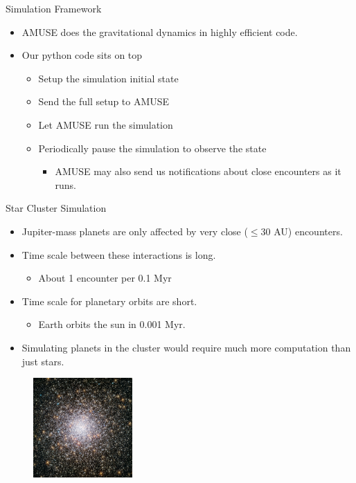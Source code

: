 \documentclass{beamer}
\begin{document}
\begin{frame}{Simulation Framework}
    \begin{itemize}
        \item AMUSE does the gravitational dynamics in highly efficient code.
        \item Our python code sits on top
        \begin{itemize}
            \item Setup the simulation initial state
            \item Send the full setup to AMUSE
            \item Let AMUSE run the simulation
            \item Periodically pause the simulation to observe the state
                \begin{itemize}
                    \item AMUSE may also send us notifications about close encounters
                        as it runs.
                \end{itemize}
        \end{itemize}
    \end{itemize}
\end{frame}

\begin{frame}{Star Cluster Simulation}
    \begin{itemize}
        \item Jupiter-mass planets are only affected by very close ($\le $30 AU) encounters.
        \item Time scale between these interactions is long.
            \begin{itemize}
                \item About 1 encounter per 0.1 Myr
            \end{itemize}
        \item Time scale for planetary orbits are short.
            \begin{itemize}
                \item Earth orbits the sun in 0.001 Myr.
            \end{itemize}
        \item Simulating planets in the cluster would require much more
            computation than just stars.
    \end{itemize}
    \begin{figure}
        \includegraphics[height=1.5in]{star_cluster.jpg}
    \end{figure}
\end{frame}
\end{document}
